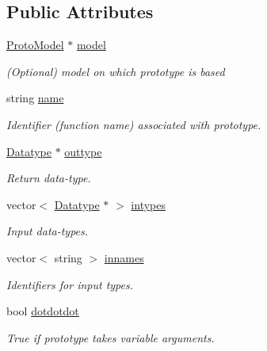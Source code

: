 \subsection*{Public Attributes}
\begin{DoxyCompactItemize}
\item 
\mbox{\hyperlink{class_proto_model}{Proto\+Model}} $\ast$ \mbox{\hyperlink{struct_prototype_pieces_a35b3c9fbc711e8623021f4e21284de13}{model}}
\begin{DoxyCompactList}\small\item\em (Optional) model on which prototype is based \end{DoxyCompactList}\item 
string \mbox{\hyperlink{struct_prototype_pieces_ac0eadd4acbffa119e16210b39e32623e}{name}}
\begin{DoxyCompactList}\small\item\em Identifier (function name) associated with prototype. \end{DoxyCompactList}\item 
\mbox{\hyperlink{class_datatype}{Datatype}} $\ast$ \mbox{\hyperlink{struct_prototype_pieces_ab145dec69a82cf13bef723679f6800b0}{outtype}}
\begin{DoxyCompactList}\small\item\em Return data-\/type. \end{DoxyCompactList}\item 
vector$<$ \mbox{\hyperlink{class_datatype}{Datatype}} $\ast$ $>$ \mbox{\hyperlink{struct_prototype_pieces_aca89ccc6fb7ef4527613909e341efe64}{intypes}}
\begin{DoxyCompactList}\small\item\em Input data-\/types. \end{DoxyCompactList}\item 
vector$<$ string $>$ \mbox{\hyperlink{struct_prototype_pieces_ab424fb1bcab5c7d008b590a24a3ad34e}{innames}}
\begin{DoxyCompactList}\small\item\em Identifiers for input types. \end{DoxyCompactList}\item 
bool \mbox{\hyperlink{struct_prototype_pieces_a06df4f0bbd4f67847962c3ae35e8945d}{dotdotdot}}
\begin{DoxyCompactList}\small\item\em True if prototype takes variable arguments. \end{DoxyCompactList}\end{DoxyCompactItemize}


